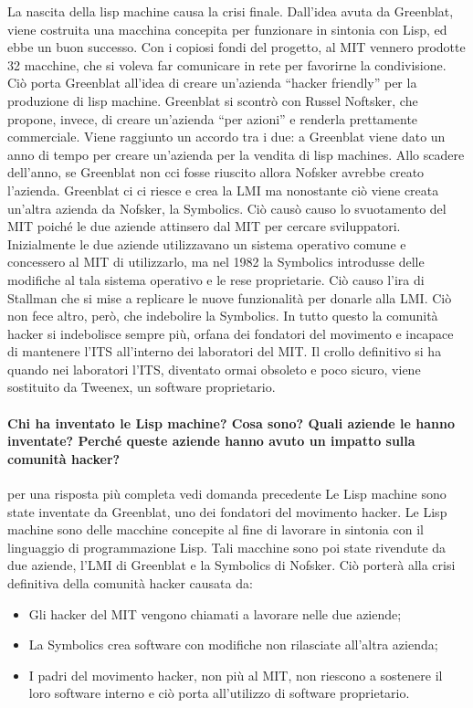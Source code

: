 \documentclass[a4paper]{article}
\begin{document}
		La nascita della lisp machine causa la crisi finale. Dall’idea avuta da Greenblat, viene costruita una macchina concepita per funzionare in sintonia con Lisp, ed ebbe un buon successo. Con i copiosi fondi del progetto, al MIT vennero prodotte 32 macchine, che si voleva far comunicare in rete per favorirne la condivisione. Ciò porta Greenblat all’idea di creare un’azienda “hacker friendly” per la produzione di lisp machine. Greenblat si scontrò con Russel Noftsker, che propone, invece, di creare un’azienda “per azioni” e renderla prettamente commerciale. Viene raggiunto un accordo tra i due: a Greenblat viene dato un anno di tempo per creare un’azienda per la vendita di lisp machines. Allo scadere dell'anno, se Greenblat non cci fosse riuscito allora Nofsker avrebbe creato l'azienda. Greenblat ci ci riesce e crea la LMI ma nonostante ciò viene creata un’altra azienda da Nofsker, la Symbolics. Ciò causò causo lo svuotamento del MIT poiché le due aziende attinsero dal MIT per cercare sviluppatori. Inizialmente le due aziende utilizzavano un sistema operativo comune e concessero al MIT di utilizzarlo, ma nel 1982 la Symbolics introdusse delle modifiche al tala sistema operativo e le rese proprietarie. Ciò causo l'ira di Stallman che si mise a replicare le nuove funzionalità per donarle alla LMI. Ciò non fece altro, però, che indebolire la Symbolics. In tutto questo la comunità hacker si indebolisce sempre più, orfana dei fondatori del movimento e incapace di mantenere l'ITS all'interno dei laboratori del MIT. Il crollo definitivo si ha quando nei laboratori l'ITS, diventato ormai obsoleto e poco sicuro, viene sostituito da Tweenex, un software proprietario.

		\paragraph{Chi ha inventato le Lisp machine? Cosa sono? Quali aziende le hanno inventate? Perché queste aziende hanno avuto un impatto sulla comunità hacker?}
		{per una risposta più completa vedi domanda precedente}
		Le Lisp machine sono state inventate da Greenblat, uno dei fondatori del movimento hacker. Le Lisp machine sono delle macchine concepite al fine di lavorare in sintonia con il linguaggio di programmazione Lisp. Tali macchine sono poi state rivendute da due aziende, l'LMI di Greenblat e la Symbolics di Nofsker. Ciò porterà alla crisi definitiva della comunità hacker causata da:
		\begin{itemize}
			\item Gli hacker del MIT vengono chiamati a lavorare nelle due aziende;
			\item La Symbolics crea software con modifiche non rilasciate all'altra azienda;
			\item I padri del movimento hacker, non più al MIT, non riescono a sostenere il loro software interno e ciò porta all'utilizzo di software proprietario.
		\end{itemize}
\end{document}
